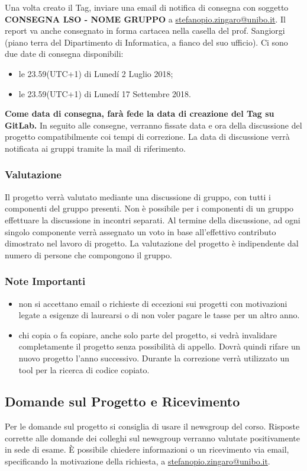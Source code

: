 \documentclass[12pt,a4paper,draft]{article}
\begin{document}
%
Una volta creato il Tag, inviare una email di notifica di consegna con soggetto \textbf{CONSEGNA LSO - NOME GRUPPO} a \url{stefanopio.zingaro@unibo.it}.
Il report va anche consegnato in forma cartacea nella casella del prof. Sangiorgi (piano terra del Dipartimento di Informatica, a fianco del suo ufficio). Ci sono due date di consegna disponibili:
\begin{itemize}
    \item le 23.59(UTC+1) di Lunedí 2 Luglio 2018;
    \item le 23.59(UTC+1) di Lunedí 17 Settembre 2018.
\end{itemize}
\textbf{Come data di consegna, farà fede la data di creazione del Tag su GitLab.}
In seguito alle consegne, verranno fissate data e ora della discussione del progetto compatibilmente coi tempi di correzione. 
La data di discussione verrà notificata ai gruppi tramite la mail di riferimento.

\subsubsection{Valutazione}
Il progetto verrà valutato mediante una discussione di gruppo, con tutti i componenti del gruppo presenti. 
Non è possibile per i componenti di un gruppo effettuare la discussione in incontri separati. 
Al termine della discussione, ad ogni singolo componente verrà assegnato un voto in base all'effettivo contributo dimostrato nel lavoro di progetto. 
La valutazione del progetto è indipendente dal numero di persone che compongono il gruppo.

\subsubsection{Note Importanti}
\begin{itemize}
    \item non si accettano email o richieste di eccezioni sui progetti con motivazioni legate a esigenze di laurearsi o di non voler pagare le tasse per un altro anno.
    \item chi copia o fa copiare, anche solo parte del progetto, si vedrà invalidare completamente il progetto senza possibilità di appello. Dovrà quindi rifare un nuovo progetto l'anno successivo. Durante la correzione verrà utilizzato un tool per la ricerca di codice copiato.
\end{itemize}

\subsection{Domande sul Progetto e Ricevimento}
Per le domande sul progetto si consiglia di usare il newsgroup del corso. 
Risposte corrette alle domande dei colleghi sul newsgroup verranno valutate positivamente in sede di esame. 
È possibile chiedere informazioni o un ricevimento via email, specificando la motivazione della richiesta, a \url{stefanopio.zingaro@unibo.it}.
\end{document}
